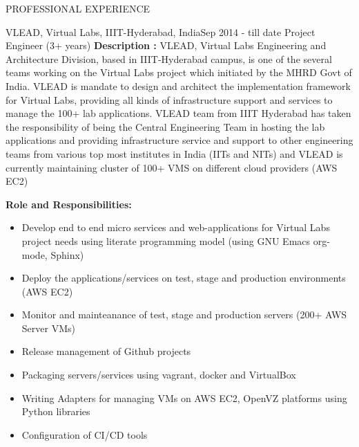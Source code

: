 \documentclass{resume} %
\begin{document}
\begin{rSection}{PROFESSIONAL EXPERIENCE}

   \begin{rSubsection}
    {VLEAD, Virtual Labs, IIIT-Hyderabad, India}{Sep 2014 - till date}
    {Project Engineer} {(3+ years)} \hfill \break \textbf{Description
      :} VLEAD, Virtual Labs Engineering and Architecture Division,
    based in IIIT-Hyderabad campus, is one of the several teams
    working on the Virtual Labs project which initiated by the MHRD
    Govt of India. VLEAD is mandate to design and architect the
    implementation framework for Virtual Labs, providing all kinds of
    infrastructure support and services to manage the 100+ lab
    applications. VLEAD team from IIIT Hyderabad has taken the
    responsibility of being the Central Engineering Team in hosting
    the lab applications and providing infrastructure service and
    support to other engineering teams from various top most
    institutes in India (IITs and NITs) and VLEAD is currently
    maintaining cluster of 100+ VMS on different cloud providers (AWS
    EC2) \\

    \break
    
    \textbf{Role and Responsibilities:}
    \begin{itemize}
      
    \item Develop end to end micro services and web-applications for
      Virtual Labs project needs using literate programming model
      (using GNU Emacs org-mode, Sphinx)

    \item Deploy the applications/services on test, stage and
      production environments (AWS EC2)

    \item Monitor and mainteanance of test, stage and production
      servers (200+ AWS Server VMs)

    \item Release management of Github projects
      
    \item Packaging servers/services using vagrant,
      docker and VirtualBox

    \item Writing Adapters for managing VMs on AWS EC2, OpenVZ
      platforms using Python libraries

    \item Configuration of CI/CD tools
      

\end{itemize}
\end{rSubsection}
\end{rSection}
\end{document}
